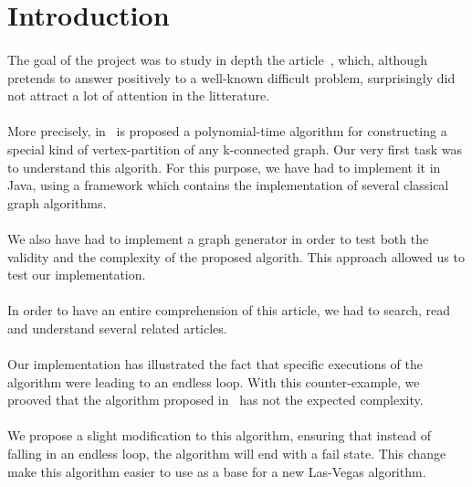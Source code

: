 \section{Introduction}
\paragraph{}
The goal of the project was to study in depth the article~\cite{JS94}, which,
although pretends to answer positively to a well-known difficult problem,
surprisingly did not attract a lot of attention in the litterature.

\paragraph{}
More precisely, in~\cite{JS94} is proposed a polynomial-time algorithm for
constructing a special kind of vertex-partition of any k-connected graph. Our
very first task was to understand this algorith. For this purpose, we have had
to implement it in Java, using a framework which contains the implementation
of several classical graph algorithms.

\paragraph{}
We also have had to implement a graph generator in order to test both the
validity and the complexity of the proposed algorith. This approach allowed
us to test our implementation.


\paragraph{}
In order to have an entire comprehension of this article, we had to search,
read and understand several related articles.

\paragraph{}
Our implementation has illustrated the fact that specific executions of the
algorithm were leading to an endless loop. With this counter-example, we
prooved that the algorithm proposed in~\cite{JS94} has not the expected
complexity.

\paragraph{}
We propose a slight modification to this algorithm, ensuring that instead of
falling in an endless loop, the algorithm will end with a fail state. This
change make this algorithm easier to use as a base for a new Las-Vegas
algorithm.
